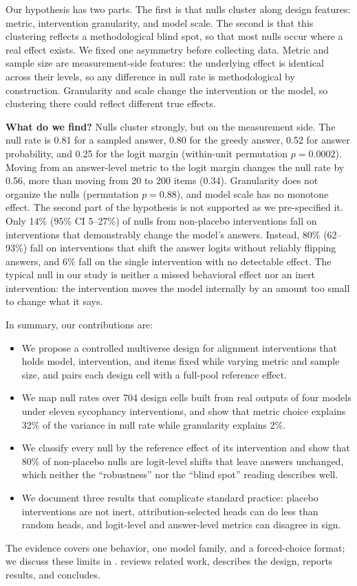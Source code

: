 Our hypothesis has two parts.
The first is that nulls cluster along design features: metric, intervention granularity, and model scale.
The second is that this clustering reflects a methodological blind spot, so that most nulls occur where a real effect exists.
We fixed one asymmetry before collecting data.
Metric and sample size are measurement-side features: the underlying effect is identical across their levels, so any difference in null rate is methodological by construction.
Granularity and scale change the intervention or the model, so clustering there could reflect different true effects.

{\bf What do we find?}
Nulls cluster strongly, but on the measurement side.
The null rate is 0.81 for a sampled answer, 0.80 for the greedy answer, 0.52 for answer probability, and 0.25 for the logit margin (within-unit permutation $p = 0.0002$).
Moving from an answer-level metric to the logit margin changes the null rate by 0.56, more than moving from 20 to 200 items (0.34).
Granularity does not organize the nulls (permutation $p = 0.88$), and model scale has no monotone effect.
The second part of the hypothesis is not supported as we pre-specified it.
Only 14\% (95\% CI 5--27\%) of nulls from non-placebo interventions fall on interventions that demonstrably change the model's answers.
Instead, 80\% (62--93\%) fall on interventions that shift the answer logits without reliably flipping answers, and 6\% fall on the single intervention with no detectable effect.
The typical null in our study is neither a missed behavioral effect nor an inert intervention: the intervention moves the model internally by an amount too small to change what it says.

In summary, our contributions are:
\begin{itemize}[leftmargin=*,itemsep=0pt,topsep=0pt]
    \item We propose a controlled multiverse design for alignment interventions that holds model, intervention, and items fixed while varying metric and sample size, and pairs each design cell with a full-pool reference effect.
    \item We map null rates over 704 design cells built from real outputs of four models under eleven sycophancy interventions, and show that metric choice explains 32\% of the variance in null rate while granularity explains 2\%.
    \item We classify every null by the reference effect of its intervention and show that 80\% of non-placebo nulls are logit-level shifts that leave answers unchanged, which neither the ``robustness'' nor the ``blind spot'' reading describes well.
    \item We document three results that complicate standard practice: placebo interventions are not inert, attribution-selected heads can do less than random heads, and logit-level and answer-level metrics can disagree in sign.
\end{itemize}

The evidence covers one behavior, one model family, and a forced-choice format; we discuss these limits in .
 reviews related work,  describes the design,  reports results, and  concludes.
